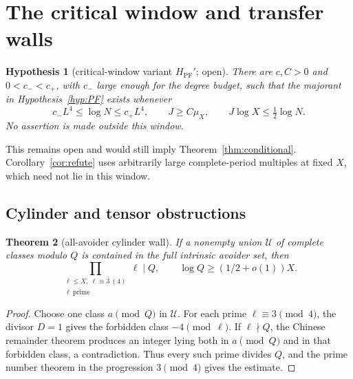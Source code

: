 \documentclass[10pt,reqno]{amsart}
\newtheorem{theorem}{Theorem}[section]
\newtheorem{hypothesis}[theorem]{Hypothesis}
\theoremstyle{definition}
\newcommand{\1}{\mathbf 1}
\newcommand{\PFp}{H_{\mathrm{PF}}'}
\begin{document}
\section{The critical window and transfer walls}\label{sec:window}
\begin{hypothesis}[critical-window variant $\PFp$; open]\label{hyp:PFprime}
There are $c,C>0$ and $0<c_-<c_+$, with $c_-$ large enough for the degree budget, such that the majorant in Hypothesis~\ref{hyp:PF} exists whenever
\[
 c_-L^4\leq\log N\leq c_+L^4,
 \qquad J\geq C\mu_X,
 \qquad J\log X\leq\tfrac12\log N.
\]
No assertion is made outside this window.
\end{hypothesis}
This remains open and would still imply Theorem~\ref{thm:conditional}.  Corollary~\ref{cor:refute} uses arbitrarily large complete-period multiples at fixed $X$, which need not lie in this window.

\subsection{Cylinder and tensor obstructions}
\begin{theorem}[all-avoider cylinder wall]\label{thm:cylinder}
If a nonempty union $\mathcal U$ of complete classes modulo $Q$ is contained in the full intrinsic avoider set, then
\[
 \prod_{\substack{\ell\leq X,\ \ell\equiv3\ (4)\\\ell\ \mathrm{prime}}}\ell\mid Q,
 \qquad \log Q\geq(1/2+o(1))X.
\]
\end{theorem}
\begin{proof}
Choose one class $a\pmod Q$ in $\mathcal U$.  For each prime $\ell\equiv3\pmod4$, the divisor $D=1$ gives the forbidden class $-4\pmod\ell$.  If $\ell\nmid Q$, the Chinese remainder theorem produces an integer lying both in $a\pmod Q$ and in that forbidden class, a contradiction.  Thus every such prime divides $Q$, and the prime number theorem in the progression $3\pmod4$ gives the estimate.
\end{proof}
\end{document}
